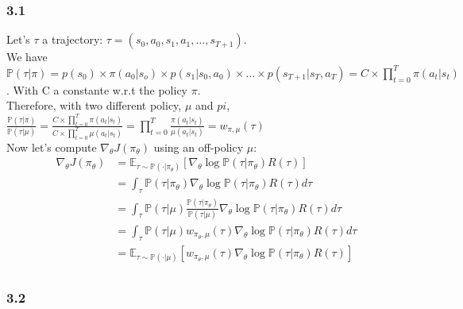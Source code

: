 \documentclass[a4paper]{article}
\begin{document}
\subsubsection*{3.1}
Let's $\tau$ a trajectory: $\tau =  (s_0, a_0, s_1, a_1, \dots, s_{T+1})$.\\
We have $\mathbb{P}(\tau | \pi) = p(s_0) \times \pi(a_0 | s_o) \times p(s_1|s_0, a_0) \times \dots \times p(s_{T+1} | s_T, a_T) = C \times \prod_{t=0}^T \pi(a_t|s_t)$.
With C a constante w.r.t the policy $\pi$.\\
Therefore, with two different policy, $\mu$ and $pi$,
$\frac{\mathbb{P}(\tau | \pi)}{\mathbb{P}(\tau | \mu)} = \frac{C \times \prod_{t=0}^T \pi(a_t|s_t)}{C \times \prod_{t=0}^T \mu(a_t|s_t)} = \prod_{t=0}^T \frac{\pi(a_t|s_t)}{\mu(a_t|s_t)} = w_{\pi, \mu}(\tau)$\\
Now let's compute $\nabla_\theta J(\pi_\theta)$ using an off-policy $\mu$:
\begin{equation*}
    \begin{aligned}
        \nabla_\theta J(\pi_\theta) & = \mathbb{E}_{\tau \sim \mathbb{P}(\cdot| \pi_\theta)}\left[ \nabla_\theta \log \mathbb{P}(\tau|\pi_\theta)R(\tau)\right]                             \\
                                    & = \int_\tau \mathbb{P}(\tau|\pi_\theta) \nabla_\theta \log \mathbb{P}(\tau|\pi_\theta)R(\tau) d\tau                                                   \\
                                    & = \int_\tau \mathbb{P}(\tau|\mu) \frac{\mathbb{P}(\tau|\pi_\theta)}{\mathbb{P}(\tau|\mu)} \nabla_\theta \log \mathbb{P}(\tau|\pi_\theta)R(\tau) d\tau \\
                                    & = \int_\tau \mathbb{P}(\tau|\mu) w_{\pi_\theta, \mu}(\tau) \nabla_\theta \log \mathbb{P}(\tau|\pi_\theta)R(\tau) d\tau                                \\
                                    & \boxed{= \mathbb{E}_{\tau \sim \mathbb{P}(\cdot|\mu)}\left[ w_{\pi_\theta, \mu}(\tau) \nabla_\theta \log \mathbb{P}(\tau|\pi_\theta)R(\tau)\right]}   \\
    \end{aligned}
\end{equation*}


\subsubsection*{3.2}
\end{document}
